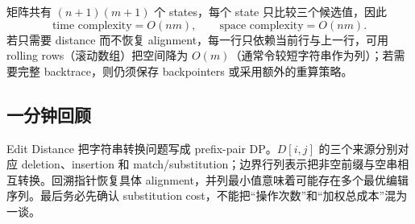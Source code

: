 矩阵共有 $(n+1)(m+1)$ 个 states，每个 state 只比较三个候选值，因此
\[
  \text{time complexity}=O(nm),\qquad
  \text{space complexity}=O(nm).
\]
若只需要 distance 而不恢复 alignment，每一行只依赖当前行与上一行，可用 rolling rows（滚动数组）把空间降为 $O(m)$（通常令较短字符串作为列）；若需要完整 backtrace，则仍须保存 backpointers 或采用额外的重算策略。

\subsection{一分钟回顾}

Edit Distance 把字符串转换问题写成 prefix-pair DP。$D[i,j]$ 的三个来源分别对应 deletion、insertion 和 match/substitution；边界行列表示把非空前缀与空串相互转换。回溯指针恢复具体 alignment，并列最小值意味着可能存在多个最优编辑序列。最后务必先确认 substitution cost，不能把“操作次数”和“加权总成本”混为一谈。
